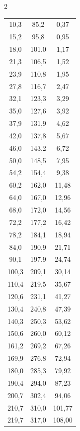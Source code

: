\documentclass[12pt,twosides,onecolumn,openany]{article}
\newenvironment{Figura}
  {\par\medskip\noindent\minipage{\linewidth}}
  {\endminipage\par\medskip}
\begin{document}
\begin{multicols}{2}
\begin{Figura}
{\begin{tabular}{c|c|c}
      & & \\
      \hline\hline
      10,3 & 85,2 & 0,37 \\
      15,2 & 95,8 & 0,95 \\
      18,0 & 101,0 & 1,17 \\
      21,3 & 106,5 & 1,52 \\
      23,9 & 110,8 & 1,95 \\
      27,8 & 116,7 & 2,47 \\
      32,1 & 123,3 & 3,29 \\
      35,0 & 127,6 & 3,92 \\
      37,9 & 131,9 & 4,62 \\
      42,0 & 137,8 & 5,67 \\
      46,0 & 143,2 & 6,72 \\
      50,0 & 148,5 & 7,95 \\
      54,2 & 154,4 & 9,38 \\
      60,2 & 162,0 & 11,48 \\
      64,0 & 167,0 & 12,96 \\
      68,0 & 172,0 & 14,56 \\
      72,2 & 177,2 & 16,42 \\
      78,2 & 184,1 & 18,94 \\
      84,0 & 190,9 & 21,71 \\
      90,1 & 197,9 & 24,74 \\
      100,3 & 209,1 & 30,14 \\
      110,4 & 219,5 & 35,67 \\
      120,6 & 231,1 & 41,27 \\
      130,4 & 240,8 & 47,39 \\
      140,3 & 250,3 & 53,62 \\
      150,6 & 260,0 & 60,12 \\
      161,2 & 269,2 & 67,26 \\
      169,9 & 276,8 & 72,94 \\
      180,0 & 285,3 & 79,92 \\
      190,4 & 294,0 & 87,23 \\
      200,7 & 302,4 & 94,06 \\
      210,7 & 310,0 & 101,77 \\
      219,7 & 317,0 & 108,00 \\
    \end{tabular}
    }
  \label{tau:AC}
\end{Figura}
\renewcommand{\arraystretch}{1.48}
\begin{Figura}

\end{Figura}
\end{multicols}
\end{document}
